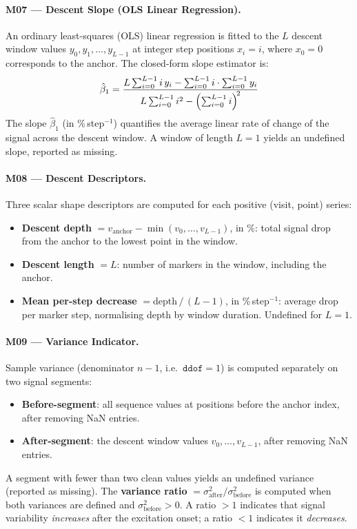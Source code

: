 \documentclass[a4paper,11pt]{article}
\begin{document}
\paragraph{M07 --- Descent Slope (OLS Linear Regression).}
An ordinary least-squares (OLS) linear regression is fitted to the $L$ descent window
values $y_0, y_1, \ldots, y_{L-1}$ at integer step positions $x_i = i$, where
$x_0 = 0$ corresponds to the anchor.
The closed-form slope estimator is:
\[
  \hat{\beta}_1 =
  \frac{L\sum_{i=0}^{L-1} i\,y_i
        - \sum_{i=0}^{L-1} i \cdot \sum_{i=0}^{L-1} y_i}
       {L\sum_{i=0}^{L-1} i^2
        - \Bigl(\sum_{i=0}^{L-1} i\Bigr)^{\!2}}
\]
The slope $\hat{\beta}_1$ (in \%\,step$^{-1}$) quantifies the average linear rate of
change of the signal across the descent window. A window of length $L = 1$ yields an
undefined slope, reported as missing.

\paragraph{M08 --- Descent Descriptors.}
Three scalar shape descriptors are computed for each positive (visit, point) series:
\begin{itemize}
  \item \textbf{Descent depth} $= v_{\mathrm{anchor}} - \min(v_0, \ldots, v_{L-1})$,
        in \%: total signal drop from the anchor to the lowest point in the window.
  \item \textbf{Descent length} $= L$: number of markers in the window, including the
        anchor.
  \item \textbf{Mean per-step decrease} $= \mathrm{depth}\,/\,(L - 1)$,
        in \%\,step$^{-1}$: average drop per marker step, normalising depth by window
        duration. Undefined for $L = 1$.
\end{itemize}

\paragraph{M09 --- Variance Indicator.}
Sample variance (denominator $n - 1$, i.e.\ $\mathtt{ddof} = 1$) is computed separately
on two signal segments:
\begin{itemize}
  \item \textbf{Before-segment}: all sequence values at positions before the anchor index,
        after removing NaN entries.
  \item \textbf{After-segment}: the descent window values $v_0, \ldots, v_{L-1}$, after
        removing NaN entries.
\end{itemize}
A segment with fewer than two clean values yields an undefined variance (reported as
missing). The \textbf{variance ratio}
$= \sigma^2_{\mathrm{after}} / \sigma^2_{\mathrm{before}}$
is computed when both variances are defined and $\sigma^2_{\mathrm{before}} > 0$.
A ratio $> 1$ indicates that signal variability \emph{increases} after the excitation
onset; a ratio $< 1$ indicates it \emph{decreases}.
\end{document}
